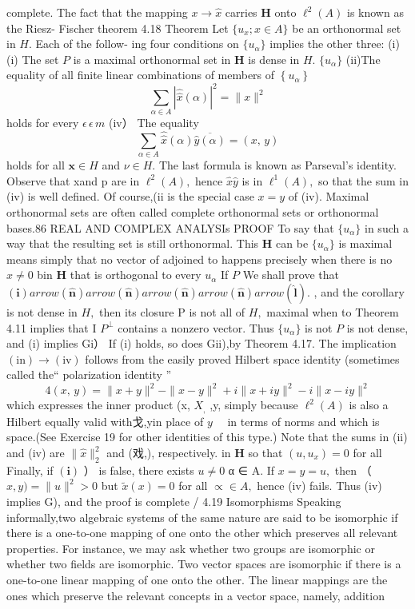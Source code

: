 complete. The fact that the mapping $x\to{\hat{x}}$ carries ${\boldsymbol{H}}$ onto $\ell^{2}(A)$ is known as the Riesz- Fischer theorem 4.18 Theorem Let $\{u_{x};x\in A\}$ be an orthonormal set in $\textstyle H.$ Each of the follow- ing four conditions on $\{u_{\alpha}\}$ implies the other three: (i) (i) The set ${\mathbf{}}P$ is a maximal orthonormal set in ${\boldsymbol{H}}$ is dense in $\textstyle H.$ $\{u_{\alpha}\}$ (ii)The equality of all finite linear combinations of members of $\left\{u_{\alpha}\right\}$ $$ \sum_{\alpha\in A}|\hat{\hat{x}}(\alpha)|^{2}=\|x\|^{2} $$ holds for every $\textstyle{\epsilon\,\epsilon\,m}$ (iv） The equality $$ \sum_{\alpha\in A}{\hat{\hat{x}}}(\alpha){\overline{{{\hat{y}}(\alpha)}}}=(x,\,y) $$ holds for all $\textstyle{\boldsymbol{x}}\in H$ and $\nu\in H.$ The last formula is known as Parseval's identity. Observe that xand p are in $\ell^{2}(A),$ hence ${\hat{x}}{\hat{y}}$ is in $\ell^{1}(A),$ so that the sum in (iv) is well defined. Of course,(ii is the special case $x=y$ of (iv). Maximal orthonormal sets are often called complete orthonormal sets or orthonormal bases.86 REAL AND COMPLEX ANALYSIs PROOF To say that $\{u_{\alpha}\}$ in such a way that the resulting set is still orthonormal. This ${\boldsymbol{H}}$ can be $\{u_{\alpha}\}$ is maximal means simply that no vector of adjoined to happens precisely when there is no $x\neq0$ bin ${\boldsymbol{H}}$ that is orthogonal to every $u_{\alpha}$ If ${\mathbf{}}P$ We shall prove that $(\mathbf{i}) arrow(\mathbf{\hat{n}}) arrow(\mathbf{\hat{n}}) arrow(\mathbf{\hat{n}}) arrow(\mathbf{\hat{n}}) arrow(\mathbf{\hat{l}}).$ , and the corollary is not dense in $\textstyle H,$ then its closure P is not all of $\textstyle H,$ maximal when to Theorem 4.11 implies that I $P^{\perp}$ contains a nonzero vector. Thus $\{u_{\alpha}\}$ is not $\boldsymbol{\mathit{P}}$ is not dense, and (i) implies Gi） If (i) holds, so does Gii),by Theorem 4.17. The implication $({\mathrm{in}})\to({\mathrm{iv}})$ follows from the easily proved Hilbert space identity (sometimes called the“ polarization identity ” $$ 4(x,\,y)=\|x+y\|^{2}-\|x-y\|^{2}+i\|x+i y\|^{2}-i\|x-i y\|^{2} $$ which expresses the inner product (x, $\scriptstyle X_{,}$ ,y, simply because $\ell^{2}(A)$ is also a Hilbert equally valid with戈,yin place of $y\quad$ in terms of norms and which is space.(See Exercise 19 for other identities of this type.) Note that the sums in (ii) and (iv) are $\|{\hat{x}}\|_{2}^{2}$ and (戏,), respectively. in ${\boldsymbol{H}}$ so that $(u,u_{x})=0$ for all Finally, if $\mathbf{(i)}$ ） is false, there exists $u\neq0$ α ∈ A. If $x=y=u,$ then （ $x,y)=\|u\|^{2}>0$ but ${\tilde{x}}(x)=0$ for all $\propto\in A,$ hence (iv) fails. Thus (iv) implies G), and the proof is complete / 4.19 Isomorphisms Speaking informally,two algebraic systems of the same nature are said to be isomorphic if there is a one-to-one mapping of one onto the other which preserves all relevant properties. For instance, we may ask whether two groups are isomorphic or whether two fields are isomorphic. Two vector spaces are isomorphic if there is a one-to-one linear mapping of one onto the other. The linear mappings are the ones which preserve the relevant concepts in a vector space, namely, addition 